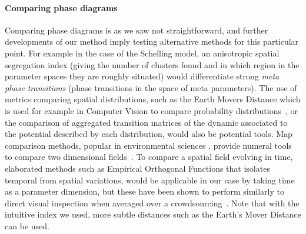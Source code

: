\documentclass[Afour,sageh,times]{sagej}
\begin{document}



\paragraph{Comparing phase diagrams}

Comparing phase diagrams is as we saw not straightforward, and further developments of our method imply testing alternative methods for this particular point. For example in the case of the Schelling model, an anisotropic spatial segregation index (giving the number of clusters found and in which region in the parameter spaces they are roughly situated) would differentiate strong \emph{meta phase transitions} (phase transitions in the space of meta parameters). The use of metrics comparing spatial distributions, such as the Earth Movers Distance which is used for example in Computer Vision to compare probability distributions~\cite{rubner2000earth}, or the comparison of aggregated transition matrices of the dynamic associated to the potential described by each distribution, would also be potential tools. Map comparison methods, popular in environmental sciences , provide numeral tools to compare two dimensional fields~\cite{visser2006map}. To compare a spatial field evolving in time, elaborated methods such as Empirical Orthogonal Functions that isolates temporal from spatial variations, would be applicable in our case by taking time as a parameter dimension, but these have been shown to perform similarly to direct visual inspection when averaged over a crowdsourcing~\cite{10.1371/journal.pone.0178165}. Note that with the intuitive index we used, more subtle distances such as the Earth's Mover Distance can be used.



\end{document}
